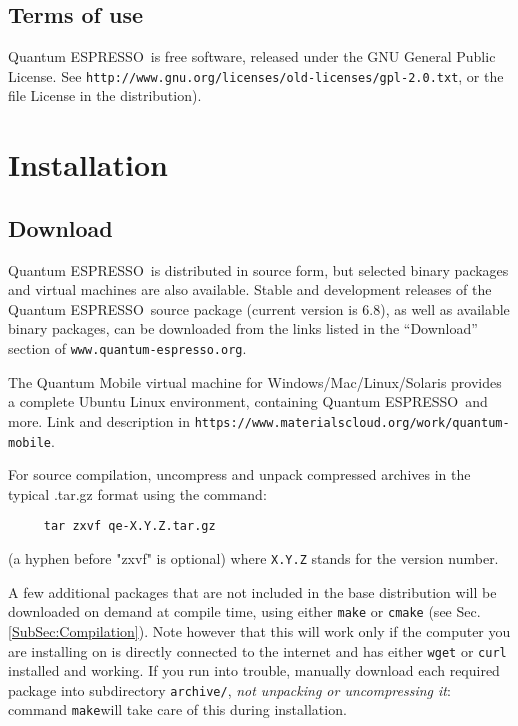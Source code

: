 \documentclass[12pt,a4paper]{article}
\def\version{6.8}
\def\qe{{\sc Quantum ESPRESSO}}
\def\make{\texttt{make}}
\begin{document}
\subsection{Terms of use}
\label{SubSec:Terms}

\qe\ is free software, released under the
GNU General Public License. See
\texttt{http://www.gnu.org/licenses/old-licenses/gpl-2.0.txt},
or the file License in the distribution).


\section{Installation}

\subsection{Download}
\label{SubSec:Download}

\qe\ is distributed in source form, but selected binary packages
and virtual machines are also available.
Stable and development releases of the \qe\ source package
(current version is \version), as well as available binary
packages, can be downloaded from the links listed in the
``Download'' section of \texttt{www.quantum-espresso.org}.

The Quantum Mobile virtual machine for Windows/Mac/Linux/Solaris
provides a complete Ubuntu Linux environment, containing \qe\ and
more. Link and description in
\texttt{https://www.materialscloud.org/work/quantum-mobile}.

For source compilation, uncompress and unpack compressed archives
in the typical .tar.gz format using the command:
\begin{verbatim}
     tar zxvf qe-X.Y.Z.tar.gz
\end{verbatim}
(a hyphen before "zxvf" is optional) where \texttt{X.Y.Z} stands for the
version number.

A few additional packages that are not included in the base distribution
will be downloaded on demand at compile time, using either \make
or \texttt{cmake} (see Sec.\ref{SubSec:Compilation}).
Note however that this will work only if the computer you are
installing on is directly connected to the internet and has
either \texttt{wget} or \texttt{curl} installed and working.
If you run into trouble, manually download each required package
into subdirectory \texttt{archive/}, {\em not unpacking or
uncompressing it}:
command \make will take care of this during installation.
\end{document}

